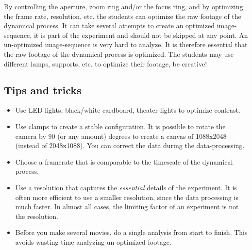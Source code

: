 \documentclass{article}
\begin{document}
By controlling the aperture, zoom ring and/or the focus ring, and by optimizing the frame rate, resolution, etc. the students can optimize the raw footage of the dynamical process. It can take several attempts to create an optimized image-sequence, it is part of the experiment and should not be skipped at any point. An un-optimized image-sequence is very hard to analyze. It is therefore essential that the raw footage of the dynamical process is optimized. The students may use different lamps, supports, etc. to optimize their footage, be creative!


\subsection{Tips and tricks}

\begin{itemize}
    \item Use LED lights, black/white cardboard, theater lights to optimize contrast. 
    \item Use clamps to create a stable configuration. It is possible to rotate the camera by 90 (or any amount) degrees to create a canvas of 1088x2048 (instead of 2048x1088). You can correct the data during the data-processing. 
    \item Choose a framerate that is comparable to the timescale of the dynamical process.
    \item Use a resolution that captures the \emph{essential} details of the experiment. It is often more efficient to use a smaller resolution, since the data processing is much faster. In almost all cases, the limiting factor of an experiment is not the resolution.
    \item Before you make several movies, do a single analysis from start to finish. This avoids wasting time analyzing un-optimized footage.
\end{itemize}
\end{document}
